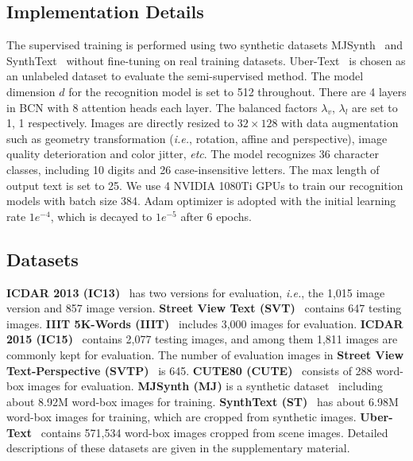\documentclass[10pt,journal,compsoc]{IEEEtran}
\def\ie{{\it i.e.}\xspace}
\def\etc{{\it etc}\xspace}
\begin{document}
\subsection{Implementation Details}

The supervised training is performed using two synthetic datasets MJSynth~\cite{jaderberg2014synthetic,jaderberg2016reading} and SynthText~\cite{gupta2016synthetic} without fine-tuning on real training datasets. Uber-Text~\cite{Ying2017UberText} is chosen as an unlabeled dataset to evaluate the semi-supervised method. The model dimension $d$ for the recognition model is set to 512 throughout. There are 4 layers in BCN with 8 attention heads each layer. The balanced factors $\lambda_v$, $\lambda_l$ are set to 1, 1 respectively. Images are directly resized to $32 \times 128$ with data augmentation such as geometry transformation (\ie, rotation, affine and perspective), image quality deterioration and color jitter, \etc. The model recognizes 36 character classes, including 10 digits and 26 case-insensitive letters. The max length of output text is set to 25. We use 4 NVIDIA 1080Ti GPUs to train our recognition models with batch size 384. Adam optimizer is adopted with the initial learning rate $1e^{-4}$, which is decayed to $1e^{-5}$ after 6 epochs.


\subsection{Datasets}

\textbf{ICDAR 2013 (IC13)}~\cite{karatzas2013icdar} has two versions for evaluation, \ie, the 1,015 image version and 857 image version. \textbf{Street View Text (SVT)}~\cite{wang2011end} contains 647 testing images. \textbf{IIIT 5K-Words (IIIT)}~\cite{mishra2012scene} includes 3,000 images for evaluation. \textbf{ICDAR 2015 (IC15)}~\cite{karatzas2015icdar} contains 2,077 testing images, and among them 1,811 images are commonly kept for evaluation. The number of evaluation images in \textbf{Street View Text-Perspective (SVTP)}~\cite{quy2013recognizing} is 645. \textbf{CUTE80 (CUTE)}~\cite{risnumawan2014robust} consists of 288 word-box images for evaluation. \textbf{MJSynth (MJ)} is a synthetic dataset~\cite{jaderberg2014synthetic,jaderberg2016reading} including about 8.92M word-box images for training. \textbf{SynthText (ST)}~\cite{gupta2016synthetic} has about 6.98M word-box images for training, which are cropped from synthetic images. \textbf{Uber-Text}~\cite{Ying2017UberText} contains 571,534 word-box images cropped from scene images. Detailed descriptions of these datasets are given in the supplementary material.
\end{document}
